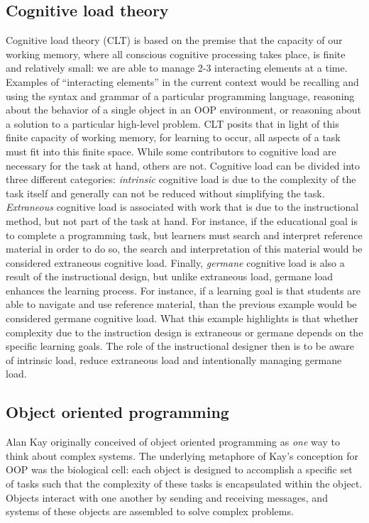 \documentclass[12pt]{article}
\begin{document}
\subsection*{Cognitive load theory}
Cognitive load theory (CLT) is based on the premise that the capacity
of our working memory, where all conscious cognitive processing takes
place, is finite and relatively small: we are able to manage 2-3
interacting elements at a time. Examples of ``interacting elements''
in the current context would be recalling and using the syntax and
grammar of a particular programming language, reasoning about the
behavior of a single object in an OOP environment, or reasoning about
a solution to a particular high-level problem. CLT posits that in
light of this finite capacity of working memory, for learning to
occur, all aspects of a task must fit into this finite space. While
some contributors to cognitive load are necessary for the task at
hand, others are not\autocite{paas_cognitive_2003}. Cognitive load can
be divided into three different categories: \emph{intrinsic} cognitive
load is due to the complexity of the task itself and generally can not
be reduced without simplifying the task. \emph{Extraneous} cognitive
load is associated with work that is due to the instructional method,
but not part of the task at hand. For instance, if the educational
goal is to complete a programming task, but learners must search and
interpret reference material in order to do so, the search and
interpretation of this material would be considered extraneous
cognitive load. Finally, \emph{germane} cognitive load is also a
result of the instructional design, but unlike extraneous load,
germane load enhances the learning process. For instance, if a
learning goal is that students are able to navigate and use reference
material, than the previous example would be considered germane
cognitive load. What this example highlights is that whether
complexity due to the instruction design is extraneous or germane
depends on the specific learning goals. The role of the instructional
designer then is to be aware of intrinsic load, reduce extraneous load
and intentionally managing germane load.

\subsection*{Object oriented programming}
Alan Kay originally conceived of object oriented programming as
\emph{one} way to think about complex
systems\autocite{kay_history_1996}. The underlying metaphore of Kay's
conception for OOP was the biological cell: each object is designed to
accomplish a specific set of tasks such that the complexity of these
tasks is encapsulated within the object. Objects interact with one
another by sending and receiving messages, and systems of these
objects are assembled to solve complex
problems\autocite{kay_history_1996}.
\end{document}
